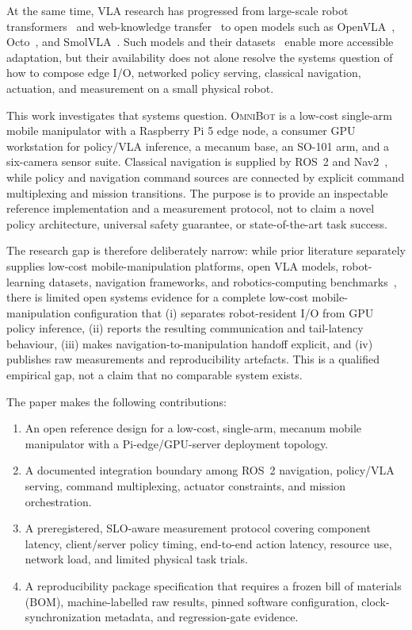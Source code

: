 \documentclass[letterpaper,10pt,conference]{ieeeconf}
\newcommand{\OmniBot}{\textsc{OmniBot}}
\begin{document}
At the same time, VLA research has progressed from large-scale robot transformers~\cite{brohan2023rt1} and web-knowledge transfer~\cite{zitkovich2023rt2} to open models such as OpenVLA~\cite{kim2025openvla}, Octo~\cite{octo2024}, and SmolVLA~\cite{shukor2025smolvla}. Such models and their datasets~\cite{openx2024,walke2023bridgedatav2,khazatsky2024droid} enable more accessible adaptation, but their availability does not alone resolve the systems question of how to compose edge I/O, networked policy serving, classical navigation, actuation, and measurement on a small physical robot.

This work investigates that systems question. \OmniBot{} is a low-cost single-arm mobile manipulator with a Raspberry Pi 5 edge node, a consumer GPU workstation for policy/VLA inference, a mecanum base, an SO-101 arm, and a six-camera sensor suite. Classical navigation is supplied by ROS~2 and Nav2~\cite{macenski2023nav2}, while policy and navigation command sources are connected by explicit command multiplexing and mission transitions. The purpose is to provide an inspectable reference implementation and a measurement protocol, not to claim a novel policy architecture, universal safety guarantee, or state-of-the-art task success.

The research gap is therefore deliberately narrow: while prior literature separately supplies low-cost mobile-manipulation platforms, open VLA models, robot-learning datasets, navigation frameworks, and robotics-computing benchmarks~\cite{robotperf2024}, there is limited open systems evidence for a complete low-cost mobile-manipulation configuration that (i) separates robot-resident I/O from GPU policy inference, (ii) reports the resulting communication and tail-latency behaviour, (iii) makes navigation-to-manipulation handoff explicit, and (iv) publishes raw measurements and reproducibility artefacts. This is a qualified empirical gap, not a claim that no comparable system exists.

\noindent The paper makes the following contributions:
\begin{enumerate}[leftmargin=*,itemsep=1pt]
    \item An open reference design for a low-cost, single-arm, mecanum mobile manipulator with a Pi-edge/GPU-server deployment topology.
    \item A documented integration boundary among ROS~2 navigation, policy/VLA serving, command multiplexing, actuator constraints, and mission orchestration.
    \item A preregistered, SLO-aware measurement protocol covering component latency, client/server policy timing, end-to-end action latency, resource use, network load, and limited physical task trials.
    \item A reproducibility package specification that requires a frozen bill of materials (BOM), machine-labelled raw results, pinned software configuration, clock-synchronization metadata, and regression-gate evidence.
\end{enumerate}
\end{document}
